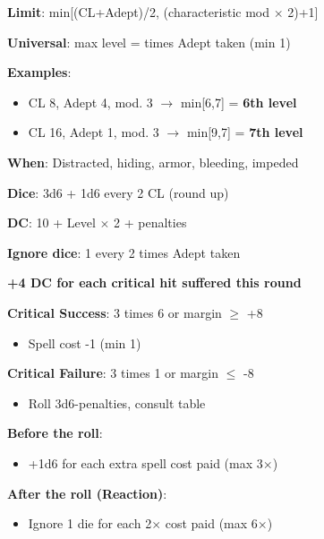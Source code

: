 \documentclass[10pt,a4paper,landscape]{article}
\begin{document}
\begin{multicols}{3}
\begin{tcolorbox}[title=MAXIMUM SPELL LEVEL]
			\textbf{Limit}: min[(CL+Adept)/2, (characteristic mod $\times$ 2)+1]
			
			\textbf{Universal}: max level = times Adept taken (min 1)
			
			\textbf{Examples}:
			\begin{itemize}[leftmargin=*,noitemsep]
				\item CL 8, Adept 4, mod. 3 $\rightarrow$ min[6,7] = \textbf{6th level}
				\item CL 16, Adept 1, mod. 3 $\rightarrow$ min[9,7] = \textbf{7th level}
			\end{itemize}
		\end{tcolorbox}
		
		\begin{tcolorbox}[title=MAGIC CHECK,colback=criticalcolor!10!white]
			\textbf{When}: Distracted, hiding, armor, bleeding, impeded
			
			\textbf{Dice}: 3d6 + 1d6 every 2 CL (round up)
			
			\textbf{DC}: 10 + Level $\times$ 2 + penalties
			
			\textbf{Ignore dice}: 1 every 2 times Adept taken
			
			\textbf{+4 DC for each critical hit suffered this round}
			
			\textcolor{successcolor}{\textbf{Critical Success}}: 3 times 6 or margin $\geq$ +8
			\begin{itemize}[leftmargin=*,noitemsep]
				\item Spell cost -1 (min 1)
			\end{itemize}
			
			\textcolor{criticalcolor}{\textbf{Critical Failure}}: 3 times 1 or margin $\leq$ -8
			\begin{itemize}[leftmargin=*,noitemsep]
				\item Roll 3d6-penalties, consult table
			\end{itemize}
		\end{tcolorbox}
		
		\begin{tcolorbox}[title=ENHANCING MAGIC CHECKS]
			\textbf{Before the roll}:
			\begin{itemize}[leftmargin=*,noitemsep]
				\item +1d6 for each extra spell cost paid (max 3$\times$)
			\end{itemize}
			
			\textbf{After the roll (Reaction)}:
			\begin{itemize}[leftmargin=*,noitemsep]
				\item Ignore 1 die for each 2$\times$ cost paid (max 6$\times$)
			\end{itemize}
			

\end{tcolorbox}
\end{multicols}
\end{document}
